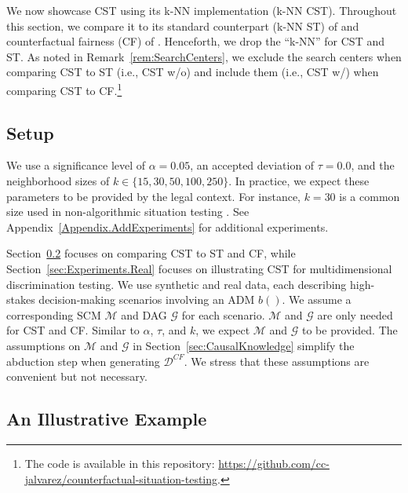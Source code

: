 %
We now showcase CST using its k-NN implementation (k-NN CST).
Throughout this section, we compare it to its standard counterpart (k-NN ST) of \textcite{Thanh_KnnSituationTesting2011} and counterfactual fairness (CF) of \textcite{Kusner2017CF}.
Henceforth, we drop the ``k-NN'' for CST and ST. 
As noted in Remark~\ref{rem:SearchCenters}, we exclude the search centers when comparing CST to ST (i.e., CST w/o) and include them (i.e., CST w/) when comparing CST to CF.\footnote{The code is available in this repository: \href{https://github.com/cc-jalvarez/counterfactual-situation-testing}{https://github.com/cc-jalvarez/counterfactual-situation-testing}.}

\subsection{Setup}
\label{sec:Experiments.SetUp}

We use a significance level of $\alpha=0.05$, an accepted deviation of $\tau=0.0$, and the neighborhood sizes of $k \in \{ 15, 30, 50, 100, 250 \}$. In practice, we expect these parameters to be provided by the legal context. For instance, $k=30$ is a common size used in non-algorithmic situation testing \parencite{Rorive2009_ProvingDiscrimination}. See Appendix~\ref{Appendix.AddExperiments} for additional experiments.

Section~\ref{sec:Experiments.IllustrativeExample} focuses on comparing CST to ST and CF, while Section~\ref{sec:Experiments.Real} focuses on illustrating CST for multidimensional discrimination testing.
We use synthetic and real data, each describing high-stakes decision-making scenarios involving an ADM $b()$.
We assume a corresponding SCM $\mathcal{M}$ and DAG $\mathcal{G}$ for each scenario.
$\mathcal{M}$ and $\mathcal{G}$ are only needed for CST and CF.
Similar to $\alpha$, $\tau$, and $k$, we expect $\mathcal{M}$ and $\mathcal{G}$ to be provided.
The assumptions on $\mathcal{M}$ and $\mathcal{G}$ in Section~\ref{sec:CausalKnowledge} simplify the abduction step when generating $\mathcal{D}^{CF}$. We stress that these assumptions are convenient but not necessary.

\subsection{An Illustrative Example}
\label{sec:Experiments.IllustrativeExample}

